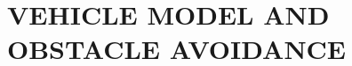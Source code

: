 \documentclass[pdflatex,sn-mathphys,Numbered]{sn-jnl}
\numberwithin{equation}{section}
\begin{document}
	\section{VEHICLE MODEL AND OBSTACLE AVOIDANCE}
	\label{sec2}
	
	
	
	
	
\end{document}
